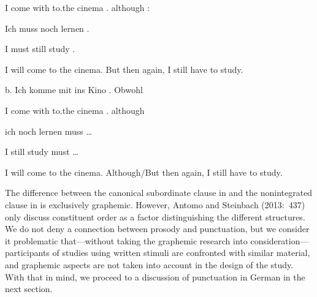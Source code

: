 \begin{styleMoutonExampleAlphaGloss}
I  come    with  to.the  cinema  .  although  :
\end{styleMoutonExampleAlphaGloss}

\begin{styleMoutonExampleAlphaGloss}
Ich  muss  noch lernen  .
\end{styleMoutonExampleAlphaGloss}

\begin{styleMoutonExampleAlphaGloss}
I  must  still  study  .
\end{styleMoutonExampleAlphaGloss}

\begin{styleMoutonExamplesTransAlpha}
I will come to the cinema. But then again, I still have to study.
\end{styleMoutonExamplesTransAlpha}

\begin{styleMoutonExampleAlpha}
b.  Ich  komme  mit  ins  Kino    .  Obwohl
\end{styleMoutonExampleAlpha}

\begin{styleMoutonExampleAlphaGloss}
I  come    with  to.the  cinema  .  although
\end{styleMoutonExampleAlphaGloss}

\begin{styleMoutonExampleAlphaGloss}
ich  noch  lernen  muss  …
\end{styleMoutonExampleAlphaGloss}

\begin{styleMoutonExampleAlphaGloss}
I  still  study    must  …
\end{styleMoutonExampleAlphaGloss}

\begin{styleMoutonExamplesTransAlpha}
I will come to the cinema. Although/But then again, I still have to study.
\end{styleMoutonExamplesTransAlpha}

\begin{styleMoutonTextAfterExample}
The difference between the canonical subordinate clause in  and the nonintegrated clause in  is exclusively graphemic. However, Antomo and Steinbach (2013:~437) only discuss constituent order as a factor distinguishing the dif\-ferent structures. We do not deny a connection between prosody and punctuation, but we consider it problematic that—without taking the graphemic research into consideration—participants of studies using written stimuli are confronted with similar material, and graphemic aspects are not taken into account in the design of the study. With that in mind, we proceed to a discussion of punctuation in German in the next section.
\end{styleMoutonTextAfterExample}

